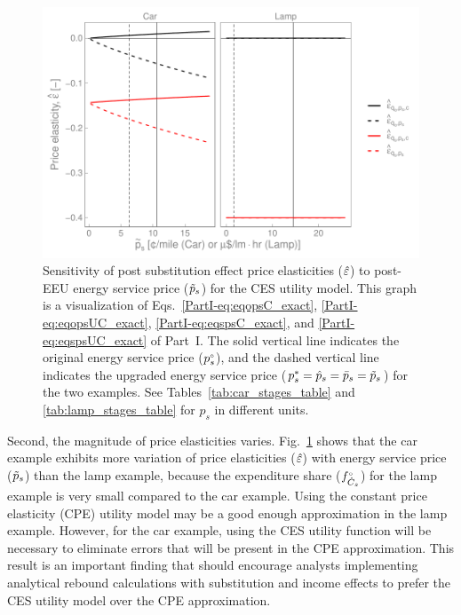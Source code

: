 \documentclass[12pt]{article}\usepackage[]{graphicx}\usepackage[]{xcolor}
\makeatletter
\def\maxwidth{ %
  \ifdim\Gin@nat@width>\linewidth
    \linewidth
  \else
    \Gin@nat@width
  \fi
}
\newenvironment{knitrout}{}{} %
\makeatother
\begin{document}
\begin{knitrout}
\color{fgcolor}\begin{figure}

{\centering \includegraphics[width=\maxwidth]{figure/PriceElasticitySensGraph-1} 

}

\caption{Sensitivity of post substitution effect price elasticities ($\hat{\varepsilon}$) to post-EEU energy service price ($\tilde{p}_{s}$) for the CES utility model. This graph is a visualization of Eqs.~\ref{PartI-eq:eqopsC_exact}, \ref{PartI-eq:eqopsUC_exact}, \ref{PartI-eq:eqspsC_exact}, and \ref{PartI-eq:eqspsUC_exact} of Part~I. The solid vertical line indicates the original energy service price (${}{p}^{\scriptscriptstyle \circ}_s$), and the dashed vertical line indicates the upgraded energy service price (${p}^*_s = \hat{p}_s = \bar{p}_s = \tilde{p}_s$) for the two examples. See Tables~\ref{tab:car_stages_table} and \ref{tab:lamp_stages_table} for $p_s$ in different units.}\label{fig:PriceElasticitySensGraph}
\end{figure}

\end{knitrout}


Second, the magnitude of price elasticities varies.
Fig.~\ref{fig:PriceElasticitySensGraph} shows that the car example exhibits
more variation of price elasticities ($\hat{\varepsilon}$) with energy service price ($\tilde{p}_s$)
than the lamp example, 
because the expenditure share (${}{f}^{\scriptscriptstyle \circ}_{\dot{C}_s}$) for the lamp example is very small
compared to the car example.
Using the constant price elasticity (CPE) utility model may be a
good enough approximation in the lamp example. 
However, for the car example, using the CES utility function will be necessary
to eliminate errors that will be present in the CPE approximation.
This result is an important finding that should encourage 
analysts implementing analytical rebound calculations
with substitution and income effects
to prefer the CES utility model over the CPE approximation.
\end{document}

